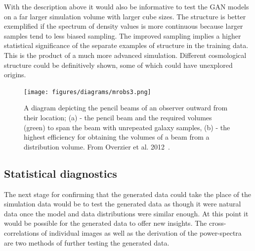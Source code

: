 \documentclass[twocolumn]{article}
\numberwithin{equation}{section}
\begin{document}
With the description above it would also be informative to test the GAN models on a far larger simulation volume with 
larger cube sizes. The structure is better exemplified if the spectrum of density values is more continuous because larger
samples tend to less biased sampling. The improved sampling implies a higher statistical significance of the separate 
examples of structure in the training data. This is the product of a much more advanced simulation. Different cosmological
structure could be definitively shown, some of which could have unexplored origins. 

\begin{figure}[hbt!]
\texttt{[image: figures/diagrams/mrobs3.png]}
\centering
\caption{A diagram depicting the pencil beams of an observer outward from their location; (a) - the pencil beam and the 
         required volumes (green) to span the beam with unrepeated galaxy samples, (b) - the highest efficiency for 
         obtaining the volumes of a beam from a distribution volume. From Overzier et al. 2012~\cite{MRObs}.}
\label{fig:MRObs}
\end{figure}



\subsection{Statistical diagnostics}

The next stage for confirming that the generated data could take the place of the simulation data would be to test the 
generated data as though it were natural data once the model and data distributions were similar enough. At this point it 
would be possible for the generated data to offer new insights. The cross-correlations of individual images as well as the 
derivation of the power-spectra are two methods of further testing the generated data.
\end{document}
